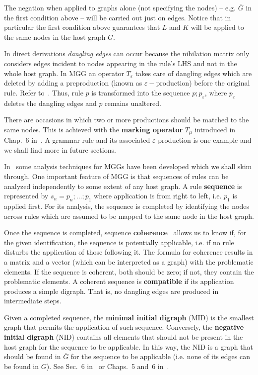 \documentclass{fundam}
\begin{document}
The negation when applied to graphs alone (not specifying the nodes)
-- e.g. $\overline{G}$ in the first condition above -- will be carried
out just on edges. Notice that in particular the first condition above
guarantees that $L$ and $K$ will be applied to the same nodes in the
host graph $G$.

In direct derivations \emph{dangling edges} can occur because the
nihilation matrix only considers edges incident to nodes appearing in
the rule's LHS and not in the whole host graph. In MGG an operator
$T_\varepsilon$ takes care of dangling edges which are deleted by
adding a preproduction (known as $\varepsilon-$production) before the
original rule. Refer to~\cite{JuanPP_1, JuanPP_2}. Thus, rule $p$ is
transformed into the sequence $p;p_{\varepsilon}$, where
$p_\varepsilon$ deletes the dangling edges and $p$ remains
unaltered.

There are occasions in which two or more productions should be matched
to the same nodes. This is achieved with the \textbf{marking operator}
$T_\mu$ introduced in Chap.~6 in~\cite{MGGBook}. A grammar rule and
its associated $\varepsilon$-production is one example and we shall
find more in future sections.

In~\cite{JuanPP_1,JuanPP_2,JuanPP_4,MGGBook} some analysis techniques
for MGGs have been developed which we shall skim through. One
important feature of MGG is that sequences of rules can be analyzed
independently to some extent of any host graph. A rule
\textbf{sequence} is represented by $s_n = p_n;\ldots; p_1$ where
application is from right to left, i.e. $p_1$ is applied first. For
its analysis, the sequence is completed by identifying the nodes
across rules which are assumed to be mapped to the same node in the
host graph.

Once the sequence is completed, sequence
\textbf{coherence}~\cite{JuanPP_1, MGGBook, MGGCombinatorics}
allows us to know if, for the given identification, the sequence is
potentially applicable, i.e. if no rule disturbs the application of
those following it. The formula for coherence results in a matrix and
a vector (which can be interpreted as a graph) with the problematic
elements. If the sequence is coherent, both should be zero; if not,
they contain the problematic elements. A coherent sequence is
\textbf{compatible} if its application produces a simple digraph. That
is, no dangling edges are produced in intermediate steps.

Given a completed sequence, the \textbf{minimal initial digraph} (MID)
is the smallest graph that permits the application of such
sequence. Conversely, the \textbf{negative initial digraph} (NID)
contains all elements that should not be present in the host graph for
the sequence to be applicable. In this way, the NID is a graph that
should be found in $\overline G$ for the sequence to be applicable
(i.e. none of its edges can be found in $G$). See Sec.~6
in~\cite{MGGCombinatorics} or Chaps.~5 and~6 in~\cite{MGGBook}.
\end{document}

